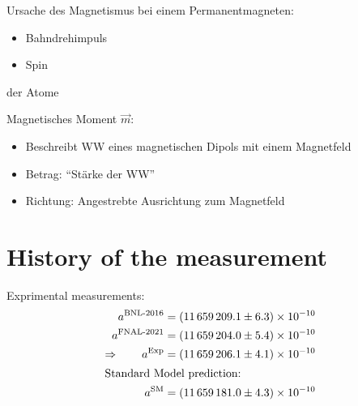 \documentclass[12pt]{beamer}
\newcommand{\Exp}{\text{Exp}}
\newcommand{\SM}{\text{SM}}
\begin{document}
\begin{frame}{\insertsection}
  Ursache des Magnetismus bei einem Permanentmagneten:
  \begin{itemize}
  \item Bahndrehimpuls
  \item Spin
  \end{itemize}
  der Atome
\end{frame}

\begin{frame}{\insertsection}
  Magnetisches Moment $\vec{m}$:
  \begin{itemize}
  \item Beschreibt WW eines magnetischen Dipols mit einem Magnetfeld
  \item Betrag: "`Stärke der WW"'
  \item Richtung: Angestrebte Ausrichtung zum Magnetfeld
  \end{itemize}
\end{frame}


\section{History of the measurement}

\newcommand{\amuBNL}{11659209.1} %
\newcommand{\numamuBNL}{\num{\amuBNL}}
\newcommand{\DamuBNL}{6.3}

\newcommand{\amuFNAL}{11659204.0}
\newcommand{\DamuFNAL}{5.4}
\newcommand{\numamuFNAL}{\num{\amuFNAL}}

\newcommand{\amuExp}{11659206.1}
\newcommand{\numamuExp}{\num{\amuExp}}
\newcommand{\DamuExp}{4.1} %

\newcommand{\amuSM}{11659181.0}
\newcommand{\numamuSM}{\num{\amuSM}}
\newcommand{\DamuSM}{4.3}

\begin{frame}{\insertsection}
  Exprimental measurements:
  \begin{align*}
    a^{\text{BNL-2016}} &= (\numamuBNL \pm \DamuBNL)\times 10^{-10} \\
    a^{\text{FNAL-2021}} &= (\numamuFNAL \pm \DamuFNAL)\times 10^{-10} \\
    \Rightarrow\qquad
    a^{\Exp} &= (\numamuExp \pm \DamuExp)\times 10^{-10} \\
    \intertext{Standard Model prediction:}
    a^\SM &= (\numamuSM \pm \DamuSM)\times 10^{-10}
  \end{align*}
\end{frame}
\end{document}

